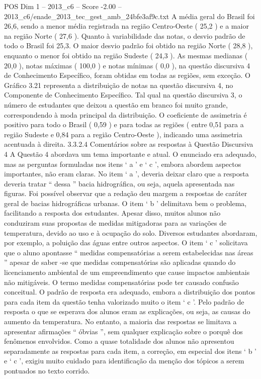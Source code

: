 \begin{textsample}{POS Dim 1 – 2013\_c6 – Score -2.00 – 2013\_c6/enade\_2013\_tec\_gest\_amb\_24bfe3af9c.txt}
A média geral do Brasil foi 26,6, sendo a menor média registrada na região Centro-Oeste ( 25,2 ) e a maior na região Norte ( 27,6 ).
Quanto à variabilidade das notas, o desvio padrão de todo o Brasil foi 25,3.
O maior desvio padrão foi obtido na região Norte ( 28,8 ), enquanto o menor foi obtido na região Sudeste ( 24,3 ).
As mesmas medianas ( 20,0 ), notas máximas ( 100,0 ) e notas mínimas ( 0,0 ), na questão discursiva 4 de Conhecimento Específico, foram obtidas em todas as regiões, sem exceção.
O Gráfico 3.21 representa a distribuição de notas na questão discursiva 4, no Componente de Conhecimento Específico.
Tal qual na questão discursiva 3, o número de estudantes que deixou a questão em branco foi muito grande, correspondendo à moda principal da distribuição.
O coeficiente de assimetria é positivo para todo o Brasil ( 0,59 ) e para todas as regiões ( entre 0,51 para a região Sudeste e 0,84 para a região Centro-Oeste ), indicando uma assimetria acentuada à direita. 3.3.2.4 Comentários sobre as respostas à Questão Discursiva 4 A Questão 4 abordava um tema importante e atual.
O enunciado era adequado, mas as perguntas formuladas nos itens ‘ a ’ e ‘ c ’, embora abordem aspectos importantes, não eram claras.
No item ‘ a ’, deveria deixar claro que a resposta deveria tratar “ dessa ” bacia hidrográfica, ou seja, aquela apresentada nas figuras.
Foi possível observar que a redação deu margem a respostas de caráter geral de bacias hidrográficas urbanas.
O item ‘ b ’ delimitava bem o problema, facilitando a resposta dos estudantes.
Apesar disso, muitos alunos não conduziram suas propostas de medidas mitigadoras para as variações de temperatura, devido ao uso e à ocupação do solo.
Diversos estudantes abordaram, por exemplo, a poluição das águas entre outros aspectos.
O item ‘ c ’ solicitava que o aluno apontasse “ medidas compensatórias a serem estabelecidas nas áreas ” apesar de saber -se que medidas compensatórias são aplicadas quando do licenciamento ambiental de um empreendimento que cause impactos ambientais não mitigáveis.
O termo medidas compensatórias pode ter causado confusão conceitual.
O padrão de resposta era adequado, embora a distribuição dos pontos para cada item da questão tenha valorizado muito o item ‘ c ’.
Pelo padrão de resposta o que se esperava dos alunos eram as explicações, ou seja, as causas do aumento da temperatura.
No entanto, a maioria das respostas se limitava a apresentar afirmações “ óbvias ”, sem qualquer explicação sobre o porquê dos fenômenos envolvidos.
Como a quase totalidade dos alunos não apresentou separadamente as respostas para cada item, a correção, em especial dos itens ‘ b ’ e ‘ c ’, exigiu muito cuidado para identificação da menção dos tópicos a serem pontuados no texto corrido.

\end{textsample}
